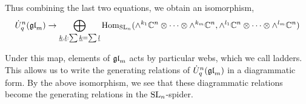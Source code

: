 \documentclass[10pt,leqno]{article}
\begin{document}
Thus combining the last two equations, we obtain an isomorphism,
\begin{equation*}
\dot{{{U}}}_q^n({\mathfrak{gl}}_m) \rightarrow \bigoplus_{{\underline{k}}, {\underline{l}} : \sum {\underline{k}} = \sum {\underline{l}}} \operatorname{Hom}_{{\rm{SL}}_n}(\wedge^{k_1} \mathbb C^n \otimes \cdots \otimes \wedge^{k_m} \mathbb C^n, \wedge^{l_1} \mathbb C^n \otimes \cdots \otimes \wedge^{l_m} \mathbb C^n)
\end{equation*}

Under this map, elements of ${\mathfrak{gl}}_m $ acts by particular webs, which we call ladders.  This allows us to write the generating relations of $ \dot{{{U}}}_q^n({\mathfrak{gl}}_m) $ in a diagrammatic form.  By the above isomorphism, we see that these diagrammatic relations become the generating relations in the $ {\rm{SL}}_n $-spider.




\end{document}
